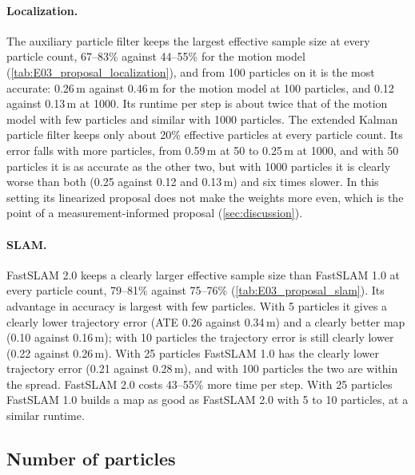 \paragraph{Localization.} The auxiliary particle filter keeps the largest effective sample size at every particle count,
67--83\% against 44--55\% for the motion model (\cref{tab:E03_proposal_localization}), and from 100 particles on it is
the most accurate: 0.26\,m against 0.46\,m for the motion model at 100 particles, and 0.12 against 0.13\,m at 1000.
Its runtime per step is about twice that of the motion model with few particles and similar with 1000 particles. The
extended Kalman particle filter keeps only about 20\% effective particles at every particle count. Its error falls with
more particles, from 0.59\,m at 50 to 0.25\,m at 1000, and with 50 particles it is as accurate as the other two, but
with 1000 particles it is clearly worse than both (0.25 against 0.12 and 0.13\,m) and six times slower. In this
setting its linearized proposal does not make the weights more even, which is the point of a measurement-informed
proposal (\cref{sec:discussion}).

\paragraph{SLAM.} FastSLAM 2.0 keeps a clearly larger effective sample size than FastSLAM 1.0 at every particle count,
79--81\% against 75--76\% (\cref{tab:E03_proposal_slam}). Its advantage in accuracy is largest with few particles. With
5 particles it gives a clearly lower trajectory error (ATE 0.26 against 0.34\,m) and a clearly better map (0.10 against
0.16\,m); with 10 particles the trajectory error is still clearly lower (0.22 against 0.26\,m). With 25 particles
FastSLAM 1.0 has the clearly lower trajectory error (0.21 against 0.28\,m), and with 100 particles the two are within the
spread. FastSLAM 2.0 costs 43--55\% more time per step. With 25 particles FastSLAM 1.0 builds a map as good as FastSLAM
2.0 with 5 to 10 particles, at a similar runtime.


\subsection{Number of particles}\label{sec:e04}

